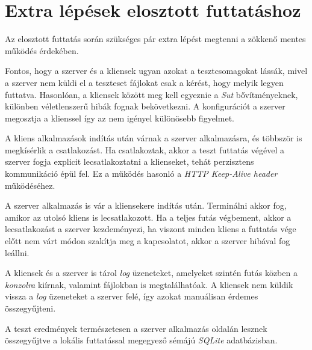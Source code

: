 \pagebreak
\section{Extra lépések elosztott futtatáshoz}

    Az elosztott futtatás során szükséges pár extra lépést megtenni a zökkenő mentes működés érdekében.

    Fontos, hogy a szerver és a kliensek ugyan azokat a tesztcsomagokat lássák, mivel a szerver nem küldi el a
    teszteset fájlokat csak a kérést, hogy melyik legyen futtatva. Hasonlóan, a kliensek között meg kell egyeznie a
    \textit{Sut} bővítményeknek, különben véletlenszerű hibák fognak bekövetkezni. A konfigurációt a szerver megosztja
    a klienssel így az nem igényel különösebb figyelmet.

    A kliens alkalmazások indítás után várnak a szerver alkalmazásra, és többször is megkísérlik a csatlakozást. Ha
    csatlakoztak, akkor a teszt futtatás végével a szerver fogja explicit lecsatlakoztatni a klienseket, tehát
    perzisztens kommunikáció épül fel. Ez a működés hasonló a \textit{\foreignlanguage{american}{HTTP Keep-Alive
    header}} működéséhez.

    A szerver alkalmazás is vár a kliensekere indítás után. Terminálni akkor fog, amikor az utolsó kliens is
    lecsatlakozott. Ha a teljes futás végbement, akkor a lecsatlakozást a szerver kezdeményezi, ha viszont minden
    kliens a futtatás vége előtt nem várt módon szakítja meg a kapcsolatot, akkor a szerver hibával fog leállni.

    A kliensek és a szerver is tárol \textit{log} üzeneteket, amelyeket szintén futás közben a \textit{konzolra}
    kiírnak, valamint fájlokban is megtalálhatóak. A kliensek nem küldik vissza a \textit{log} üzeneteket a szerver
    felé, így azokat manuálisan érdemes összegyűjteni.

    A teszt eredmények természetesen a szerver alkalmazás oldalán lesznek összegyűjtve a lokális futtatással megegyező
    sémájú \textit{SQLite} adatbázisban.
